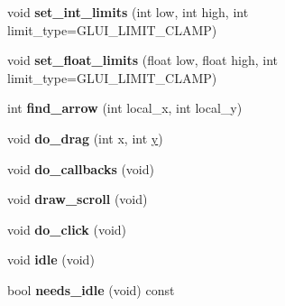 \begin{DoxyCompactItemize}
\item 
\hypertarget{class_g_l_u_i___scrollbar_a24df16f55c3810ac5c3e09f1d7d5c70d}{void {\bfseries set\+\_\+int\+\_\+limits} (int low, int high, int limit\+\_\+type=G\+L\+U\+I\+\_\+\+L\+I\+M\+I\+T\+\_\+\+C\+L\+A\+M\+P)}\label{class_g_l_u_i___scrollbar_a24df16f55c3810ac5c3e09f1d7d5c70d}

\item 
\hypertarget{class_g_l_u_i___scrollbar_a41dd618579772fb4b69d87ddd10a601d}{void {\bfseries set\+\_\+float\+\_\+limits} (float low, float high, int limit\+\_\+type=G\+L\+U\+I\+\_\+\+L\+I\+M\+I\+T\+\_\+\+C\+L\+A\+M\+P)}\label{class_g_l_u_i___scrollbar_a41dd618579772fb4b69d87ddd10a601d}

\item 
\hypertarget{class_g_l_u_i___scrollbar_ab81345b11efd1e3901443d68451d5a9f}{int {\bfseries find\+\_\+arrow} (int local\+\_\+x, int local\+\_\+y)}\label{class_g_l_u_i___scrollbar_ab81345b11efd1e3901443d68451d5a9f}

\item 
\hypertarget{class_g_l_u_i___scrollbar_abc9e5c7daaf6bac77eb8af728d46ddd8}{void {\bfseries do\+\_\+drag} (int x, int \hyperlink{_ice_utils_8h_aa7ffaed69623192258fb8679569ff9ba}{y})}\label{class_g_l_u_i___scrollbar_abc9e5c7daaf6bac77eb8af728d46ddd8}

\item 
\hypertarget{class_g_l_u_i___scrollbar_aec86dd3e95390d09b427670227d091e9}{void {\bfseries do\+\_\+callbacks} (void)}\label{class_g_l_u_i___scrollbar_aec86dd3e95390d09b427670227d091e9}

\item 
\hypertarget{class_g_l_u_i___scrollbar_ae9bede2305c61af3abb50ab05e91be72}{void {\bfseries draw\+\_\+scroll} (void)}\label{class_g_l_u_i___scrollbar_ae9bede2305c61af3abb50ab05e91be72}

\item 
\hypertarget{class_g_l_u_i___scrollbar_a83109afdb43d6d8a4cd3e38a4c9aed8a}{void {\bfseries do\+\_\+click} (void)}\label{class_g_l_u_i___scrollbar_a83109afdb43d6d8a4cd3e38a4c9aed8a}

\item 
\hypertarget{class_g_l_u_i___scrollbar_ab63e876c8f8e9a781632a09081f286ef}{void {\bfseries idle} (void)}\label{class_g_l_u_i___scrollbar_ab63e876c8f8e9a781632a09081f286ef}

\item 
\hypertarget{class_g_l_u_i___scrollbar_a025837fc483650dad77140a6a860d608}{bool {\bfseries needs\+\_\+idle} (void) const }\label{class_g_l_u_i___scrollbar_a025837fc483650dad77140a6a860d608}


\end{DoxyCompactItemize}
